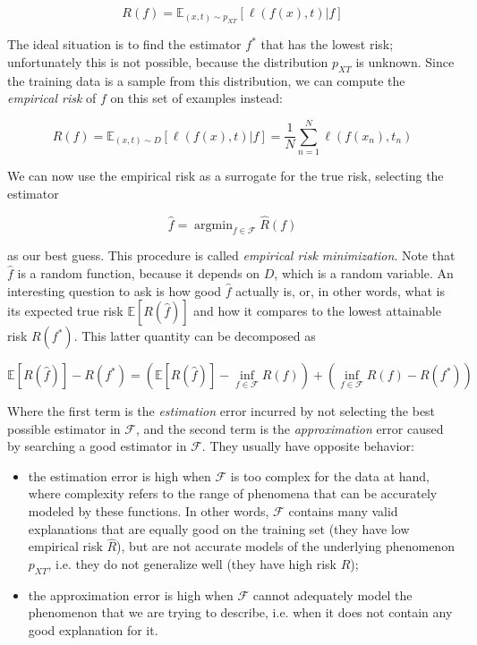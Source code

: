 \documentclass[12pt]{book}
\DeclareMathOperator*{\argmin}{argmin}
\begin{document}
\begin{equation}
R(f)=\mathbb{E}_{(x,t)\sim p_{XT}}\left[\ell(f(x),t) \vert f \right]
\end{equation}

The ideal situation is to find the estimator $f^*$ that has the lowest risk; unfortunately this is not possible, because the distribution $p_{XT}$ is unknown. Since the training data is a sample from this distribution, we can compute the \emph{empirical risk} of $f$ on this set of examples instead:

\begin{equation}
\hat{R}(f)=\mathbb{E}_{(x,t)\sim D}\left[\ell(f(x),t)\vert f\right]=\frac{1}{N}\sum_{n=1}^N \ell(f(x_n),t_n)
\end{equation}

We can now use the empirical risk as a surrogate for the true risk, selecting the estimator

\begin{equation}
\hat{f}=\argmin_{f\in\mathcal{F}}\hat{R}(f)
\end{equation}

as our best guess. This procedure is called \emph{empirical risk minimization}. Note that $\hat{f}$ is a random function, because it depends on $D$, which is a random variable. An interesting question to ask is how good $\hat{f}$ actually is, or, in other words, what is its expected true risk $\mathbb{E}[R(\hat{f})]$ and how it compares to the lowest attainable risk $R(f^*)$. This latter quantity can be decomposed as

\begin{equation}
\mathbb{E}[R(\hat{f})]-R(f^*)=
\left(\mathbb{E}[R(\hat{f})]-\inf_{f\in\mathcal{F}} R(f)\right)
+\left(\inf_{f\in\mathcal{F}} R(f)-R(f^*)\right)
\end{equation}

Where the first term is the \emph{estimation} error incurred by not selecting the best possible estimator in $\mathcal{F}$, and the second term is the \emph{approximation} error caused by searching a good estimator in $\mathcal{F}$. They usually have opposite behavior:

\begin{itemize}
\item the estimation error is high when $\mathcal{F}$ is too complex for the data at hand, where complexity refers to the range of phenomena that can be accurately modeled by these functions. In other words, $\mathcal{F}$ contains many valid explanations that are equally good on the training set (they have low empirical risk $\hat{R}$), but are not accurate models of the underlying phenomenon $p_{XT}$, i.e. they do not generalize well (they have high risk $R$);
\item the approximation error is high when $\mathcal{F}$ cannot adequately model the phenomenon that we are trying to describe, i.e. when it does not contain any good explanation for it.
\end{itemize}
\end{document}

